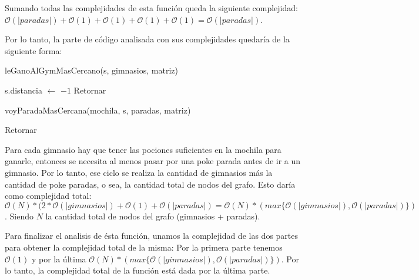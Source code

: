 Sumando todas las complejidades de esta función queda la siguiente complejidad: $\mathcal{O}(|paradas|) + \mathcal{O}(1) + \mathcal{O}(1) + \mathcal{O}(1) + \mathcal{O}(1) = \mathcal{O}(|paradas|)$.

Por lo tanto, la parte de código analisada con sus complejidades quedaría de la siguiente forma:

\begin{algorithm}[H]
\label{}
\begin{algorithmic}[]

 

	 

		\State leGanoAlGymMasCercano(s, gimnasios, matriz) 

	 
		\State s.distancia $\leftarrow$ $-1$ 
		\State Retornar 
	
	\Else

		\State voyParadaMasCercana(mochila, s, paradas, matriz) 

	\EndIf

\EndWhile

\State Retornar 

\medskip
\Statex \underline{}
\end{algorithmic}
\end{algorithm}


Para cada gimnasio hay que tener las pociones suficientes en la mochila para ganarle, entonces se necesita al menos pasar por una poke parada antes de ir a un gimnasio. Por lo tanto, ese ciclo se realiza la cantidad de gimnasios más la cantidad de poke paradas, o sea, la cantidad total de nodos del grafo. Esto daría como complejidad total: $\mathcal{O}(N)* ( 2*\mathcal{O}(|gimnasios|) + \mathcal{O}(1) + \mathcal{O}(|paradas|) = \mathcal{O}(N) * (max\{\mathcal{O}(|gimnasios|), \mathcal{O}(|paradas|)\})$. Siendo $N$ la cantidad total de nodos del grafo (gimnasios + paradas).

Para finalizar el analisis de ésta función, unamos la complejidad de las dos partes para obtener la complejidad total de la misma: Por la primera parte tenemos $\mathcal{O}(1)$ y por la última $\mathcal{O}(N) * (max\{\mathcal{O}(|gimnasios|), \mathcal{O}(|paradas|)\})$. Por lo tanto, la complejidad total de la función está dada por la última parte.

